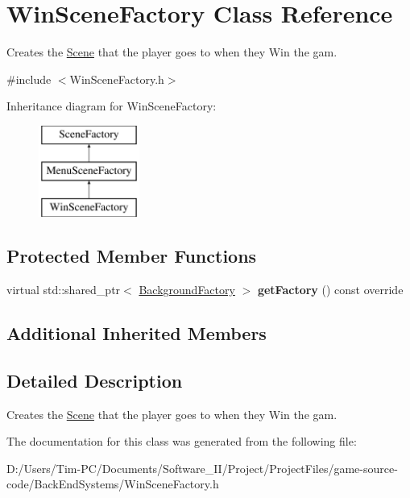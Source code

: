 \hypertarget{class_win_scene_factory}{}\section{Win\+Scene\+Factory Class Reference}
\label{class_win_scene_factory}


Creates the \hyperlink{class_scene}{Scene} that the player goes to when they Win the gam.  




{\ttfamily \#include $<$Win\+Scene\+Factory.\+h$>$}

Inheritance diagram for Win\+Scene\+Factory\+:\begin{figure}[H]
\begin{center}
\leavevmode
\includegraphics[height=3.000000cm]{d3/db7/class_win_scene_factory}
\end{center}
\end{figure}
\subsection*{Protected Member Functions}
\begin{DoxyCompactItemize}
\item 
\mbox{\label{class_win_scene_factory_af2e1c7ae34601b5f4017937d7bd381bb}} 
virtual std\+::shared\+\_\+ptr$<$ \hyperlink{class_background_factory}{Background\+Factory} $>$ {\bfseries get\+Factory} () const override
\end{DoxyCompactItemize}
\subsection*{Additional Inherited Members}


\subsection{Detailed Description}
Creates the \hyperlink{class_scene}{Scene} that the player goes to when they Win the gam. 

The documentation for this class was generated from the following file\+:\begin{DoxyCompactItemize}
\item 
D\+:/\+Users/\+Tim-\/\+P\+C/\+Documents/\+Software\+\_\+\+I\+I/\+Project/\+Project\+Files/game-\/source-\/code/\+Back\+End\+Systems/Win\+Scene\+Factory.\+h\end{DoxyCompactItemize}

